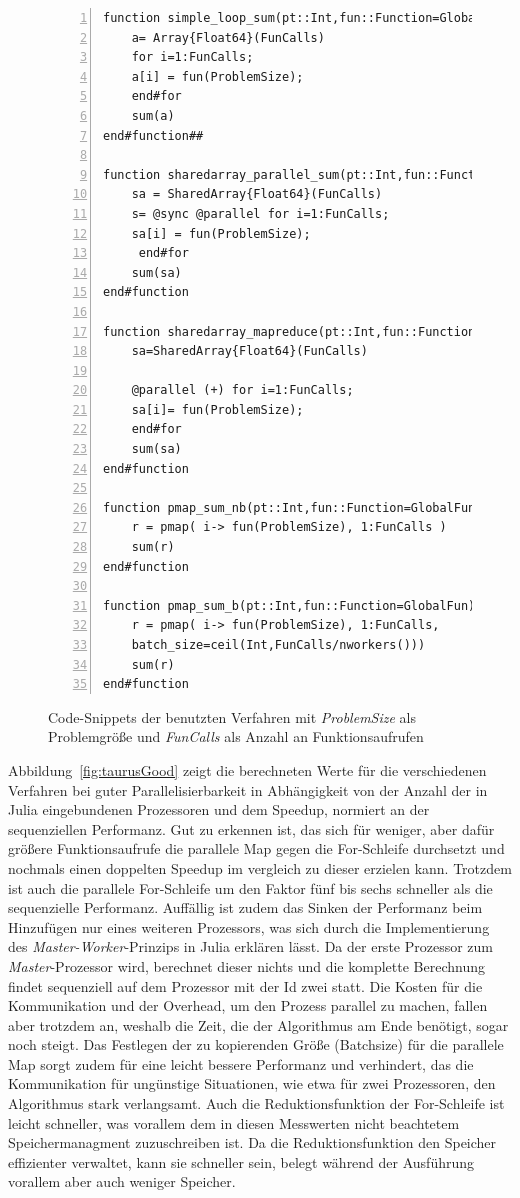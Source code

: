\documentclass[proseminar,german,utf8]{zihpub}
\begin{document}
\begin{figure}[hbt!]
\begin{Verbatim}[baselinestretch=1,fontsize=\scriptsize,numbers=left,frame=single,stepnumber=5,xleftmargin=1cm,xrightmargin=1cm]
function simple_loop_sum(pt::Int,fun::Function=GlobalFun)
    a= Array{Float64}(FunCalls)
    for i=1:FunCalls; 
	a[i] = fun(ProblemSize); 
	end#for
    sum(a)
end#function##

function sharedarray_parallel_sum(pt::Int,fun::Function=GlobalFun)
    sa = SharedArray{Float64}(FunCalls)
    s= @sync @parallel for i=1:FunCalls; 
	sa[i] = fun(ProblemSize);
	 end#for
    sum(sa)
end#function

function sharedarray_mapreduce(pt::Int,fun::Function=GlobalFun)
    sa=SharedArray{Float64}(FunCalls)

    @parallel (+) for i=1:FunCalls; 
	sa[i]= fun(ProblemSize); 
	end#for
    sum(sa)
end#function

function pmap_sum_nb(pt::Int,fun::Function=GlobalFun)
    r = pmap( i-> fun(ProblemSize), 1:FunCalls )
    sum(r)
end#function

function pmap_sum_b(pt::Int,fun::Function=GlobalFun)
    r = pmap( i-> fun(ProblemSize), 1:FunCalls, 
	batch_size=ceil(Int,FunCalls/nworkers()))
    sum(r)
end#function
\end{Verbatim}
  \caption{Code-Snippets der benutzten Verfahren mit \textit{ProblemSize} als Problemgröße und  \textit{FunCalls} als Anzahl an Funktionsaufrufen}
 \label{fig:CodeSnippet}
\end{figure}

Abbildung~\ref{fig:taurusGood} zeigt die berechneten Werte für die verschiedenen Verfahren bei guter Parallelisierbarkeit in Abhängigkeit von der Anzahl der in Julia eingebundenen Prozessoren und dem Speedup, normiert an der sequenziellen Performanz. Gut zu erkennen ist, das sich für weniger, aber dafür größere Funktionsaufrufe die parallele Map gegen die For-Schleife durchsetzt und nochmals einen doppelten Speedup im vergleich zu dieser erzielen kann. Trotzdem ist auch die parallele For-Schleife um den Faktor fünf bis sechs schneller als die sequenzielle Performanz. Auffällig ist zudem das Sinken der Performanz beim Hinzufügen nur eines weiteren Prozessors, was sich durch die Implementierung des \textit{Master-Worker}-Prinzips in Julia erklären lässt. Da der erste Prozessor zum \textit{Master}-Prozessor wird, berechnet dieser nichts und die komplette Berechnung findet sequenziell auf dem Prozessor mit der Id zwei statt. Die Kosten für die Kommunikation und der Overhead, um den Prozess parallel zu machen, fallen aber trotzdem an, weshalb die Zeit, die der Algorithmus am Ende benötigt, sogar noch steigt. Das Festlegen der zu kopierenden Größe (Batchsize) für die parallele Map sorgt zudem für eine leicht bessere Performanz und verhindert, das die Kommunikation für ungünstige Situationen, wie etwa für zwei Prozessoren, den Algorithmus stark verlangsamt. Auch die Reduktionsfunktion der For-Schleife ist leicht schneller, was vorallem dem in diesen Messwerten nicht beachtetem Speichermanagment zuzuschreiben ist. Da die Reduktionsfunktion den Speicher effizienter verwaltet, kann sie schneller sein, belegt während der Ausführung vorallem aber auch weniger Speicher.
\end{document}
